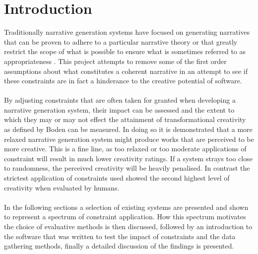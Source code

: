 \documentclass[letterpaper]{article}
\begin{document}
\section{Introduction}
Traditionally narrative generation systems have focused on generating narratives that can be proven to adhere to a particular narrative theory \cite{Perez2015}  or that greatly restrict the scope of what is possible \cite{leon2008creative} to ensure what is sometimes referred to as appropriateness \cite{Sharples96anaccount}. This project attempts to remove some of the first order assumptions about what constitutes a coherent narrative in an attempt to see if these constraints are in fact a hinderance to the creative potential of software.\\ 
\\By adjusting constraints that are often taken for granted when developing a narrative generation system, their impact can be assessed and the extent to which they may or may not effect the attainment of transformational creativity as defined by Boden \cite{BODEN1998347} can be measured. In doing so it is demonstrated that a more relaxed narrative generation system might produce works that are perceived to be more creative. This is a fine line, as too relaxed or too moderate applications of constraint will result in much lower creativity ratings. If a system strays too close to randomness, the perceived creativity will be heavily penalised. In contrast the strictest application of constraints used showed the second highest level of creativity when evaluated by humans.\\
\\In the following sections a selection of existing systems are presented and shown to represent a spectrum of constraint application. How this spectrum motivates the choice of evaluative methods is then discussed, followed by an introduction to the software that was written to test the impact of constraints and the data gathering methods, finally a detailed discussion of the findings is presented.

\end{document}
